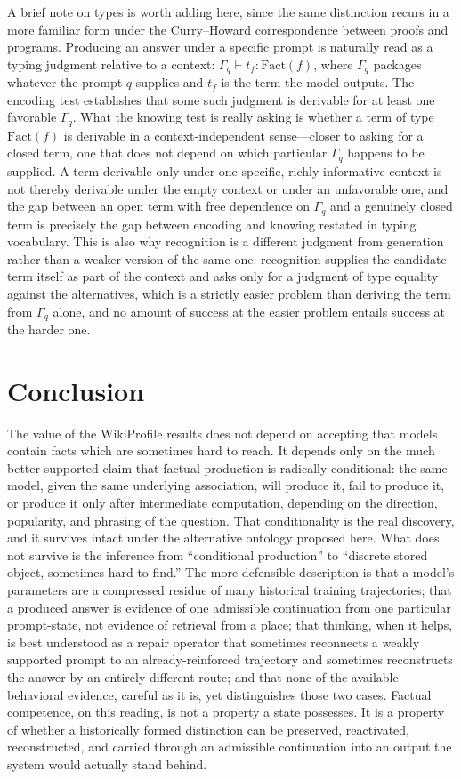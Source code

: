 \documentclass[11pt]{article}
\begin{document}
A brief note on types is worth adding here, since the same distinction recurs in a more familiar form under the Curry--Howard correspondence between proofs and programs. Producing an answer under a specific prompt is naturally read as a typing judgment relative to a context: $\Gamma_q \vdash t_f : \mathrm{Fact}(f)$, where $\Gamma_q$ packages whatever the prompt $q$ supplies and $t_f$ is the term the model outputs. The encoding test establishes that some such judgment is derivable for at least one favorable $\Gamma_q$. What the knowing test is really asking is whether a term of type $\mathrm{Fact}(f)$ is derivable in a context-independent sense---closer to asking for a closed term, one that does not depend on which particular $\Gamma_q$ happens to be supplied. A term derivable only under one specific, richly informative context is not thereby derivable under the empty context or under an unfavorable one, and the gap between an open term with free dependence on $\Gamma_q$ and a genuinely closed term is precisely the gap between encoding and knowing restated in typing vocabulary. This is also why recognition is a different judgment from generation rather than a weaker version of the same one: recognition supplies the candidate term itself as part of the context and asks only for a judgment of type equality against the alternatives, which is a strictly easier problem than deriving the term from $\Gamma_q$ alone, and no amount of success at the easier problem entails success at the harder one.

\section{Conclusion}

The value of the WikiProfile results does not depend on accepting that models contain facts which are sometimes hard to reach. It depends only on the much better supported claim that factual production is radically conditional: the same model, given the same underlying association, will produce it, fail to produce it, or produce it only after intermediate computation, depending on the direction, popularity, and phrasing of the question. That conditionality is the real discovery, and it survives intact under the alternative ontology proposed here. What does not survive is the inference from ``conditional production'' to ``discrete stored object, sometimes hard to find.'' The more defensible description is that a model's parameters are a compressed residue of many historical training trajectories; that a produced answer is evidence of one admissible continuation from one particular prompt-state, not evidence of retrieval from a place; that thinking, when it helps, is best understood as a repair operator that sometimes reconnects a weakly supported prompt to an already-reinforced trajectory and sometimes reconstructs the answer by an entirely different route; and that none of the available behavioral evidence, careful as it is, yet distinguishes those two cases. Factual competence, on this reading, is not a property a state possesses. It is a property of whether a historically formed distinction can be preserved, reactivated, reconstructed, and carried through an admissible continuation into an output the system would actually stand behind.
\end{document}
